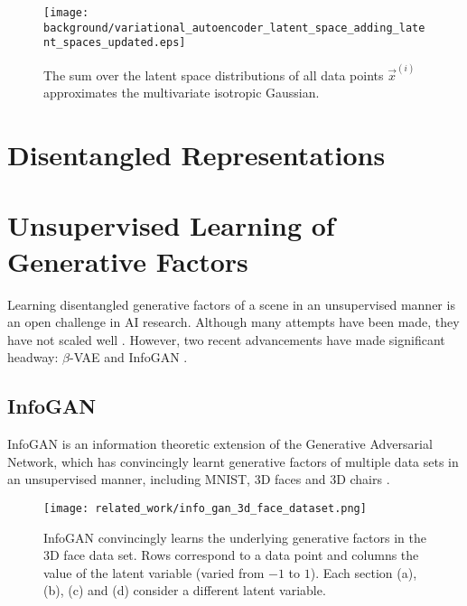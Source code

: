 \begin{landscape}
\begin{figure}[h!]
\centering
\captionsetup{justification=centering}
\texttt{[image: background/variational\_autoencoder\_latent\_space\_adding\_latent\_spaces\_updated.eps]}
\caption{The sum over the latent space distributions of all data points $\vec{x}^{(i)}$ approximates the multivariate isotropic Gaussian. \cite{Dykeman2016}}
\label{fig:variational_autoencoder_latent_space_adding_latent_spaces_updated}
\end{figure}
\end{landscape}



%
%
%
%
%
\section{Disentangled Representations}
\cite{Higgins2016, Thiagarajan2016}





%
%
%
%
%
\section{Unsupervised Learning of Generative Factors}
Learning disentangled generative factors of a scene in an unsupervised manner is an open challenge in AI research. Although many attempts have been made, they have not scaled well \cite{Thiagarajan2016, Schmidhuber1992, Desjardins2012, Tang2013, Cohen2014}. However, two recent advancements have made significant headway: $\beta$-VAE and InfoGAN \cite{Chen2016, Thiagarajan2016}.

\subsection{InfoGAN}
InfoGAN is an information theoretic extension of the Generative Adversarial Network, which has convincingly learnt generative factors of multiple data sets in an unsupervised manner, including MNIST, 3D faces and 3D chairs \cite{Chen2016}.

\begin{figure}[h!]
\centering
\captionsetup{justification=centering}
\texttt{[image: related\_work/info\_gan\_3d\_face\_dataset.png]}
\caption{InfoGAN convincingly learns the underlying generative factors in the 3D face data set. Rows correspond to a data point and columns the value of the latent variable (varied from $-1$ to $1$). Each section (a), (b), (c) and (d) consider a different latent variable. \cite{Chen2016}}
\label{fig:info_gan_3d_face_dataset}
\end{figure}

